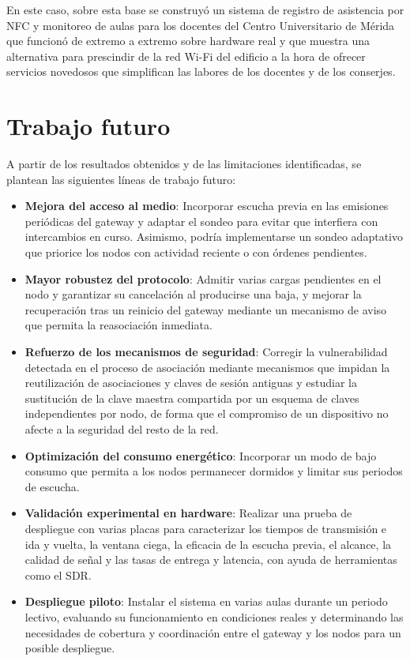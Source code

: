 En este caso, sobre esta base se construyó un sistema de registro de asistencia por NFC y monitoreo de aulas para los docentes del Centro Universitario de Mérida que funcionó de extremo a extremo sobre hardware real y que muestra una alternativa para prescindir de la red Wi-Fi del edificio a la hora de ofrecer servicios novedosos que simplifican las labores de los docentes y de los conserjes.
  
\section{Trabajo futuro}


A partir de los resultados obtenidos y de las limitaciones identificadas, se plantean las siguientes líneas de trabajo futuro:

\begin{itemize}
    \item \textbf{Mejora del acceso al medio}: Incorporar escucha previa en las emisiones periódicas del gateway y adaptar el sondeo para evitar que interfiera con intercambios en curso. Asimismo, podría implementarse un sondeo adaptativo que priorice los nodos con actividad reciente o con órdenes pendientes.

    \item \textbf{Mayor robustez del protocolo}: Admitir varias cargas pendientes en el nodo y garantizar su cancelación al producirse una baja, y mejorar la recuperación tras un reinicio del gateway mediante un mecanismo de aviso que permita la reasociación inmediata.

    \item \textbf{Refuerzo de los mecanismos de seguridad}: Corregir la vulnerabilidad detectada en el proceso de asociación mediante mecanismos que impidan la reutilización de asociaciones y claves de sesión antiguas y estudiar la sustitución de la clave maestra compartida por un esquema de claves independientes por nodo, de forma que el compromiso de un dispositivo no afecte a la seguridad del resto de la red.

    \item \textbf{Optimización del consumo energético}: Incorporar un modo de bajo consumo que permita a los nodos permanecer dormidos y limitar sus periodos de escucha.

    \item \textbf{Validación experimental en hardware}: Realizar una prueba de despliegue con varias placas para caracterizar los tiempos de transmisión e ida y vuelta, la ventana ciega, la eficacia de la escucha previa, el alcance, la calidad de señal y las tasas de entrega y latencia, con ayuda de herramientas como el SDR.

    \item \textbf{Despliegue piloto}: Instalar el sistema en varias aulas durante un periodo lectivo, evaluando su funcionamiento en condiciones reales y determinando las necesidades de cobertura y coordinación entre el gateway y los nodos para un posible despliegue.
\end{itemize}